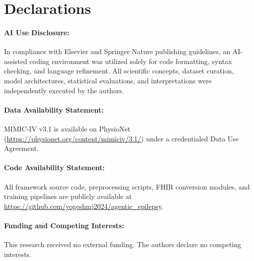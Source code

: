\documentclass[11pt,a4paper]{article}
\begin{document}
\section*{Declarations}

\paragraph{AI Use Disclosure:} In compliance with Elsevier and Springer Nature publishing guidelines, an AI-assisted coding environment was utilized solely for code formatting, syntax checking, and language refinement. All scientific concepts, dataset curation, model architectures, statistical evaluations, and interpretations were independently executed by the authors.

\paragraph{Data Availability Statement:} MIMIC-IV v3.1 is available on PhysioNet (\url{https://physionet.org/content/mimiciv/3.1/}) under a credentialed Data Use Agreement. 

\paragraph{Code Availability Statement:} All framework source code, preprocessing scripts, FHIR conversion modules, and training pipelines are publicly available at \url{https://github.com/yogeshmj2024/agentic_epilepsy}.

\paragraph{Funding and Competing Interests:} This research received no external funding. The authors declare no competing interests.

\clearpage
\end{document}
